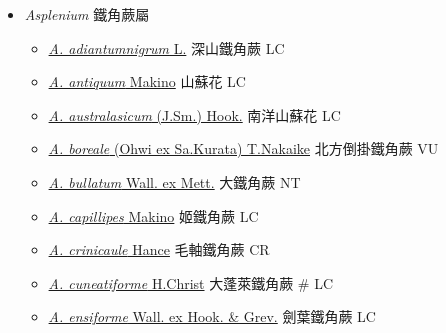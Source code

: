 
  \begin{itemize}
 \item[    ] \textit{Asplenium} 鐵角蕨屬
                                
  \begin{itemize}
        \item[] \href{http://www.theplantlist.org/tpl1.1/search?q=Asplenium+adiantumnigrum}{\textit{A. adiantumnigrum} L.}   深山鐵角蕨   LC
        \item[] \href{http://www.theplantlist.org/tpl1.1/search?q=Asplenium+antiquum}{\textit{A. antiquum} Makino}   山蘇花   LC
        \item[] \href{http://www.theplantlist.org/tpl1.1/search?q=Asplenium+australasicum}{\textit{A. australasicum} (J.Sm.) Hook.}   南洋山蘇花   LC
        \item[] \href{http://www.theplantlist.org/tpl1.1/search?q=Asplenium+boreale}{\textit{A. boreale} (Ohwi ex Sa.Kurata) T.Nakaike}   北方倒掛鐵角蕨   VU
        \item[] \href{http://www.theplantlist.org/tpl1.1/search?q=Asplenium+bullatum}{\textit{A. bullatum} Wall. ex Mett.}   大鐵角蕨   NT
        \item[] \href{http://www.theplantlist.org/tpl1.1/search?q=Asplenium+capillipes}{\textit{A. capillipes} Makino}   姬鐵角蕨   LC
        \item[] \href{http://www.theplantlist.org/tpl1.1/search?q=Asplenium+crinicaule}{\textit{A. crinicaule} Hance}   毛軸鐵角蕨   CR
        \item[] \href{http://www.theplantlist.org/tpl1.1/search?q=Asplenium+cuneatiforme}{\textit{A. cuneatiforme} H.Christ}   大蓬萊鐵角蕨  \# LC
        \item[] \href{http://www.theplantlist.org/tpl1.1/search?q=Asplenium+ensiforme}{\textit{A. ensiforme} Wall. ex Hook. \& Grev.}   劍葉鐵角蕨   LC

\end{itemize}
\end{itemize}
